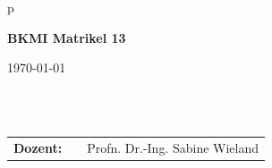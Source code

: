 \begin{center}
\begin{tabular}{p{\textwidth}}
\begin{center}
\large{\textbf{BKMI Matrikel 13}} \\
\small{}
\end{center}

\begin{center}
\large{\today}
\end{center}

\\

\\

\begin{center}
\begin{tabular}{lll}
\textbf{Dozent:} & & Profn. Dr.-Ing. Sabine Wieland\\
\end{tabular}
\end{center}

\end{tabular}
\end{center}
